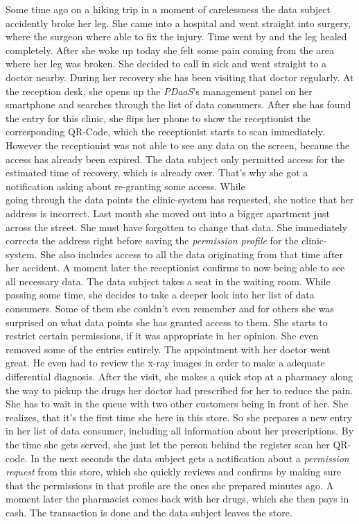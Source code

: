 \documentclass[12pt,english,a4paper,titlepage,cleardoublepage=empty,dottedtoc]{report}
\begin{document}
Some time ago on a hiking trip in a moment of carelessness the data
subject accidently broke her leg. She came into a hospital and went
straight into surgery, where the surgeon where able to fix the injury.
Time went by and the leg healed completely. After she woke up today she
felt some pain coming from the area where her leg was broken. She
decided to call in sick and went straight to a doctor nearby. During her
recovery she has been visiting that doctor regularly. At the reception
desk, she opens up the \emph{PDaaS}'s management panel on her smartphone
and searches through the list of data consumers. After she has found the
entry for this clinic, she flips her phone to show the receptionist the
corresponding QR-Code, which the receptionist starts to scan
immediately. However the receptionist was not able to see any data on
the screen, because the access has already been expired. The data
subject only permitted access for the estimated time of recovery, which
is already over. That's why she got a notification asking about
re-granting some access. While\\
going through the data points the clinic-system has requested, she
notice that her address is incorrect. Last month she moved out into a
bigger apartment just across the street. She must have forgotten to
change that data. She immediately corrects the address right before
saving the \emph{permission profile} for the clinic-system. She also
includes access to all the data originating from that time after her
accident. A moment later the receptionist confirms to now being able to
see all necessary data. The data subject takes a seat in the waiting
room. While passing some time, she decides to take a deeper look into
her list of data consumers. Some of them she couldn't even remember and
for others she was surprised on what data points she has granted access
to them. She starts to restrict certain permissions, if it was
appropriate in her opinion. She even removed some of the entries
entirely. The appointment with her doctor went great. He even had to
review the x-ray images in order to make a adequate differential
diagnosis. After the visit, she makes a quick stop at a pharmacy along
the way to pickup the drugs her doctor had prescribed for her to reduce
the pain. She has to wait in the queue with two other customers being in
front of her. She realizes, that it's the first time she here in this
store. So she prepares a new entry in her list of data consumer,
including all information about her prescriptions. By the time she gets
served, she just let the person behind the register scan her QR-code. In
the next seconds the data subject gets a notification about a
\emph{permission request} from this store, which she quickly reviews and
confirms by making sure that the permissions in that profile are the
ones she prepared minutes ago. A moment later the pharmacist comes back
with her drugs, which she then pays in cash. The transaction is done and
the data subject leaves the store.
\end{document}
